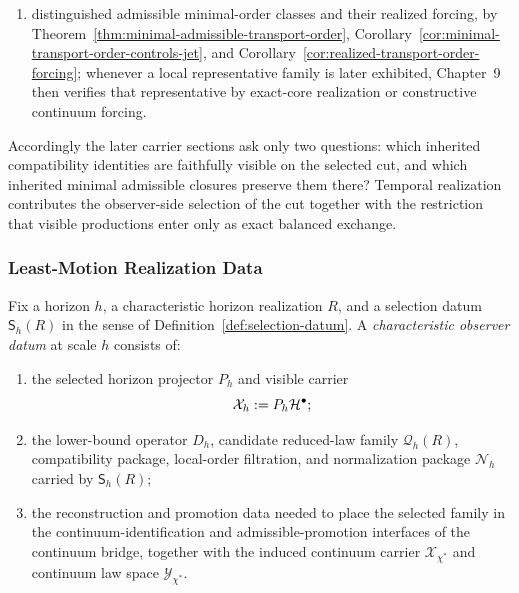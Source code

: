 \begin{remark}
\begin{enumerate}[label=(\roman*), leftmargin=2em, itemsep=0.2em]
      Corollary~\ref{cor:realized-isotropic-symmetric-response-scalarization};
\item distinguished admissible minimal-order classes and their realized
      forcing, by
      Theorem~\ref{thm:minimal-admissible-transport-order},
      Corollary~\ref{cor:minimal-transport-order-controls-jet}, and
      Corollary~\ref{cor:realized-transport-order-forcing}; whenever a local
      representative family is later exhibited, Chapter~9 then verifies that
      representative by exact-core realization or constructive continuum
      forcing.
\end{enumerate}
Accordingly the later carrier sections ask only two questions: which inherited
compatibility identities are faithfully visible on the selected cut, and which
inherited minimal admissible closures preserve them there? Temporal
realization contributes the observer-side selection of the cut together with
the restriction that visible productions enter only as exact balanced
exchange.
\end{remark}

\subsubsection{Least-Motion Realization Data}

\begin{definition}
\label{def:characteristic-observer-datum}
Fix a horizon \(h\), a characteristic horizon realization \(R\), and a
selection datum \(\mathsf S_h(R)\) in the sense of
Definition~\ref{def:selection-datum}. A \emph{characteristic observer datum}
at scale \(h\) consists of:
\begin{enumerate}[label=(\roman*), leftmargin=2em, itemsep=0.2em]
\item the selected horizon projector \(P_h\) and visible carrier
      \[
      \mathcal X_h:=P_h\mathcal{H}^\bullet;
      \]
\item the lower-bound operator \(D_h\), candidate reduced-law family
      \(\mathcal Q_h(R)\), compatibility package, local-order filtration, and
      normalization package \(\mathcal N_h\) carried by \(\mathsf S_h(R)\);
\item the reconstruction and promotion data needed to place the selected family
      in the continuum-identification and admissible-promotion interfaces of
      the continuum bridge, together with the induced continuum carrier
      \(\mathcal X_{\chi^\ast}\) and continuum law space
      \(\mathcal Y_{\chi^\ast}\).
\end{enumerate}
\end{definition}

